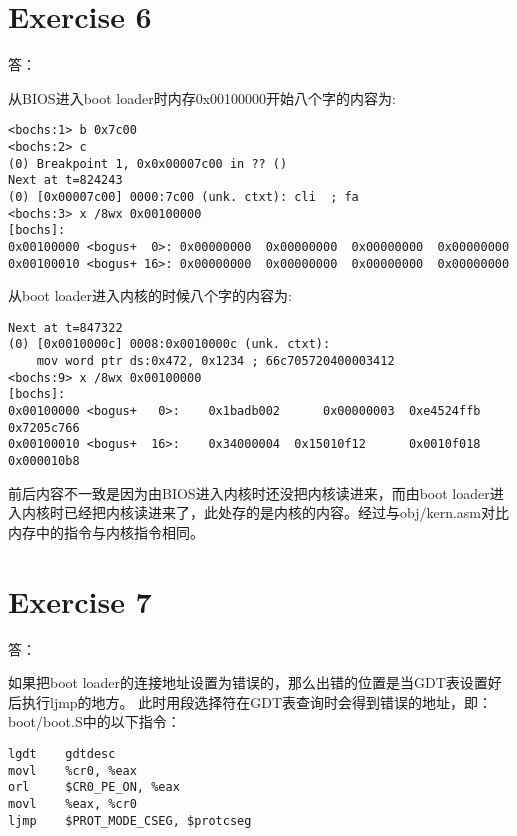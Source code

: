 \documentclass{article}
\begin{document}
\section{Exercise 6}
\begin{Large}答：\end{Large}
从BIOS进入boot loader时内存0x00100000开始八个字的内容为:
\begin{verbatim}
<bochs:1> b 0x7c00
<bochs:2> c
(0) Breakpoint 1, 0x0x00007c00 in ?? ()
Next at t=824243
(0) [0x00007c00] 0000:7c00 (unk. ctxt): cli  ; fa
<bochs:3> x /8wx 0x00100000
[bochs]:
0x00100000 <bogus+  0>:	0x00000000	0x00000000	0x00000000	0x00000000
0x00100010 <bogus+ 16>:	0x00000000	0x00000000	0x00000000	0x00000000
\end{verbatim}
从boot loader进入内核的时候八个字的内容为:
\begin{verbatim}
Next at t=847322
(0) [0x0010000c] 0008:0x0010000c (unk. ctxt): 
    mov word ptr ds:0x472, 0x1234 ; 66c705720400003412
<bochs:9> x /8wx 0x00100000
[bochs]:
0x00100000 <bogus+   0>:	0x1badb002		0x00000003	0xe4524ffb		0x7205c766
0x00100010 <bogus+  16>:	0x34000004	0x15010f12		0x0010f018		0x000010b8
\end{verbatim}
前后内容不一致是因为由BIOS进入内核时还没把内核读进来，而由boot loader进入内核时已经把内核读进来了，此处存的是内核的内容。经过与obj/kern.asm对比内存中的指令与内核指令相同。


\section{Exercise 7}
\begin{Large}答：\end{Large}
如果把boot loader的连接地址设置为错误的，那么出错的位置是当GDT表设置好后执行ljmp的地方。
此时用段选择符在GDT表查询时会得到错误的地址，即：boot/boot.S中的以下指令：
\begin{verbatim}
lgdt    gdtdesc
movl    %cr0, %eax
orl     $CR0_PE_ON, %eax
movl    %eax, %cr0
ljmp    $PROT_MODE_CSEG, $protcseg
\end{verbatim}
\end{document}
